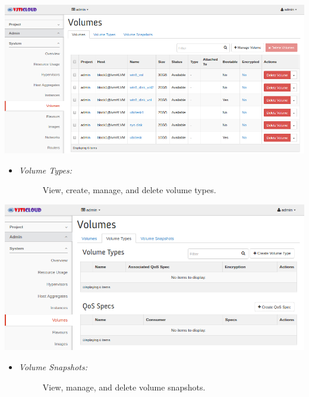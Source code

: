 \documentclass[letterpaper,10pt,english]{sphinxmanual}
\begin{document}
\begin{description}
\begin{itemize}
\begin{description}
\end{description}

\end{itemize}

\includegraphics{sys_volumes.png}
\begin{itemize}
\item {} \begin{description}
\item[{\emph{Volume Types:}}] \leavevmode
View, create, manage, and delete volume types.

\end{description}

\end{itemize}

\includegraphics{sys_volume_types.png}
\begin{itemize}
\item {} \begin{description}
\item[{\emph{Volume Snapshots:}}] \leavevmode
View, manage, and delete volume snapshots.

\end{description}

\end{itemize}


\end{description}
\end{document}
